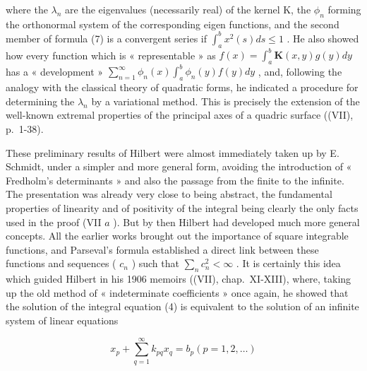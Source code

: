 where the \(\lambda_{n}\) are the eigenvalues (necessarily real) of the kernel K, the \(\phi_{n}\) forming the orthonormal system of the corresponding eigen functions, and the second member of formula (7) is a convergent series if \(\int_{a}^{b} x^{2}(s) ds \leqslant 1\) . He also showed how every function which is « representable » as \(f(x) = \int_{a}^{b} \mathbf{K}(x, y) g(y) dy\) has a « development » \(\sum_{n=1}^{\infty} \phi_{n}(x) \int_{a}^{b} \phi_{n}(y) f(y) dy\) , and, following the analogy with the classical theory of quadratic forms, he indicated a procedure for determining the \(\lambda_{n}\) by a variational method. This is precisely the extension of the well-known extremal properties of the principal axes of a quadric surface ((VII), p.~1-38).

These preliminary results of Hilbert were almost immediately taken up by E. Schmidt, under a simpler and more general form, avoiding the introduction of « Fredholm's determinants » and also the passage from the finite to the infinite. The presentation was already very close to being abstract, the fundamental properties of linearity and of positivity of the integral being clearly the only facts used in the proof (VII \(a\) ). But by then Hilbert had developed much more general concepts. All the earlier works brought out the importance of square integrable functions, and Parseval's formula established a direct link between these functions and sequences ( \(c_n\) ) such that \(\sum_{n} c_n^2 < \infty\) . It is certainly this idea which guided Hilbert in his 1906 memoirs ((VII), chap.~XI-XIII), where, taking up the old method of « indeterminate coefficients » once again, he showed that the solution of the integral equation (4) is equivalent to the solution of an infinite system of linear equations

\[
x _ {p} + \sum_ {q = 1} ^ {\infty} k _ {p q} x _ {q} = b _ {p} (p = 1, 2, \dots)\tag{8}
\]

